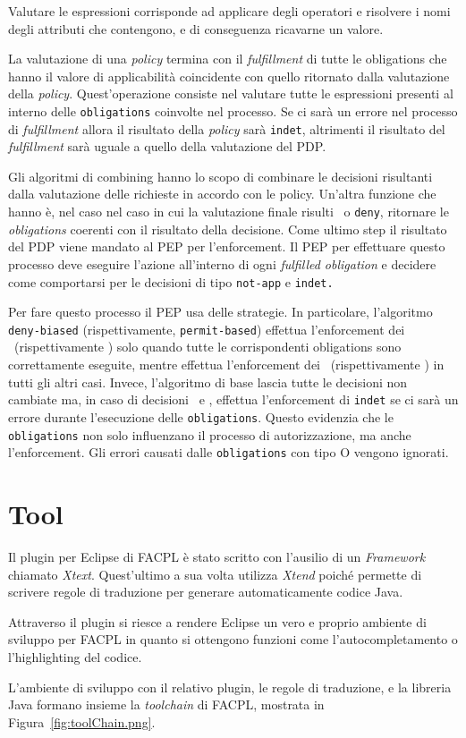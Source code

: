 Valutare le espressioni corrisponde ad applicare degli operatori e risolvere i nomi degli attributi che contengono, e di conseguenza ricavarne un valore. \par

La valutazione di una \textit{policy} termina con il \textit{fulfillment} di tutte le obligations  che hanno il valore di applicabilità coincidente con quello ritornato dalla valutazione della \textit{policy}. Quest'operazione consiste nel valutare tutte le espressioni presenti al interno delle \texttt{obligations} coinvolte nel processo. Se ci sarà un errore nel processo di \textit{fulfillment} allora il risultato della \textit{policy} sarà \texttt{indet}, altrimenti il risultato del \textit{fulfillment} sarà uguale a quello della valutazione del PDP. \par
Gli algoritmi di combining hanno lo scopo di combinare le decisioni risultanti dalla valutazione delle richieste in accordo con le policy. Un'altra funzione che hanno è, nel caso nel caso in cui la valutazione finale risulti \permit \ o \texttt{deny}, ritornare le \textit{obligations} coerenti con il risultato della decisione.  
Come ultimo step il risultato del \ac{PDP} viene mandato al \ac{PEP} per l'enforcement.
Il PEP per effettuare questo processo deve eseguire l'azione all'interno di ogni \textit{fulfilled obligation} e decidere come comportarsi per le decisioni di tipo \texttt{not-app} e \texttt{indet.} \par
Per fare questo processo il \ac{PEP} usa delle strategie. In particolare, l'algoritmo \texttt{deny-biased} (rispettivamente, \texttt{permit-based}) effettua l'enforcement dei \permit \ (rispettivamente \deny) solo quando tutte le corrispondenti obligations sono correttamente eseguite, mentre effettua l'enforcement dei \deny \  (rispettivamente \permit) in tutti gli altri casi. Invece, l'algoritmo di base lascia tutte le decisioni non cambiate ma, in caso di decisioni \permit \ e \deny, effettua l'enforcement di \texttt{indet} se ci sarà un errore durante l'esecuzione delle \texttt{obligations}. Questo evidenzia che le \texttt{obligations} non solo influenzano il processo di autorizzazione, ma anche l'enforcement. Gli errori causati dalle \texttt{obligations} con tipo O vengono ignorati.


\section{Tool}
\label{sec:tool}
Il plugin per Eclipse di \ac{FACPL} è stato scritto con l'ausilio di un \textit{Framework} chiamato \textit{Xtext}. Quest'ultimo a sua volta utilizza \textit{Xtend} poiché permette di scrivere regole di traduzione per generare automaticamente codice Java.\par
Attraverso il plugin si riesce a rendere Eclipse un vero e proprio ambiente di sviluppo per \ac{FACPL} in quanto si ottengono funzioni come l'autocompletamento o l'highlighting del codice.\par
L'ambiente di sviluppo con il relativo plugin, le regole di traduzione, e la libreria Java formano insieme la \textit{toolchain} di \ac{FACPL}, mostrata in Figura~\ref{fig:toolChain.png}.

